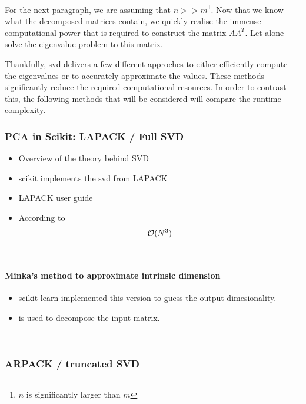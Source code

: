 For the next paragraph, we are assuming that $n>>m$\footnote{$n$ is significantly larger than $m$}.
Now that we know what the decomposed matrices contain, we quickly realise the immense computational power that is required to construct the matrix $AA^T$.
Let alone solve the eigenvalue problem to this matrix.

Thankfully, \gls{svd} delivers a few different approches to either efficiently compute the eigenvalues or to accurately approximate the values.
These methods significantly reduce the required computational resources.
In order to contrast this, the following methods that will be considered will compare the runtime complexity.



\clearpage



\subsubsection{PCA in Scikit: LAPACK / Full SVD}

\begin{itemize}
	\item Overview of the theory behind SVD
	\item scikit implements the svd from LAPACK
	\item LAPACK user guide \cite{anderson1999lapack}
	\item According to \cite{wright2001large}
	$$\mathcal{O}(N^3)$$
\end{itemize}

\ \clearpage
\ \clearpage


\paragraph{Minka's method to approximate intrinsic dimension}

\begin{itemize}
	\item scikit-learn implemented this version \cite{minka2000automatic} to guess the output dimesionality. 
	\item \cite{halko2011finding, brunton2019data} is used to decompose the input matrix.
\end{itemize}

\ \clearpage


\subsubsection{ARPACK / truncated SVD}

